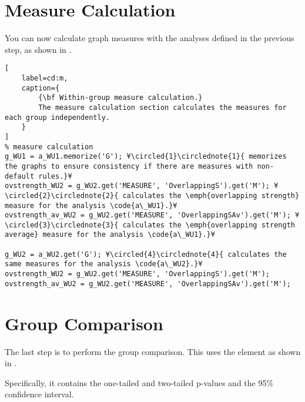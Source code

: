 \documentclass{tufte-handout}
\begin{document}
\section{Measure Calculation}

You can now calculate graph measures with the analyses defined in the previous step, as shown in .

\begin{lstlisting}[
	label=cd:m,
	caption={
		{\bf Within-group measure calculation.}
		The measure calculation section calculates the measures for each group independently.
	}
]
% measure calculation
g_WU1 = a_WU1.memorize('G'); ¥\circled{1}\circlednote{1}{ memorizes the graphs to ensure consistency if there are measures with non-default rules.}¥
ovstrength_WU2 = g_WU2.get('MEASURE', 'OverlappingS').get('M'); ¥\circled{2}\circlednote{2}{ calculates the \emph{overlapping strength} measure for the analysis \code{a\_WU1}.}¥
ovstrength_av_WU2 = g_WU2.get('MEASURE', 'OverlappingSAv').get('M'); ¥\circled{3}\circlednote{3}{ calculates the \emph{overlapping strength average} measure for the analysis \code{a\_WU1}.}¥

g_WU2 = a_WU2.get('G'); ¥\circled{4}\circlednote{4}{ calculates the same measures for the analysis \code{a\_WU2}.}¥
ovstrength_WU2 = g_WU2.get('MEASURE', 'OverlappingS').get('M');
ovstrength_av_WU2 = g_WU2.get('MEASURE', 'OverlappingSAv').get('M');
\end{lstlisting}

\section{Group Comparison}

The last step is to perform the group comparison. This uses the element  as shown in .

Specifically, it contains the one-tailed and two-tailed p-values and the 95\% confidence interval.
\end{document}
